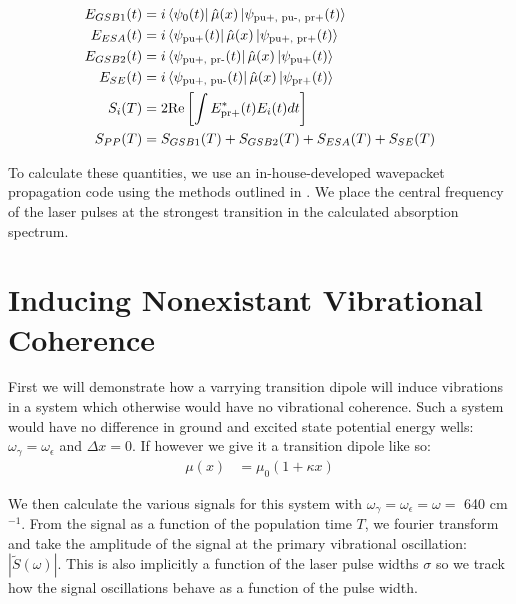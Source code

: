 \begin{align*}
	E_{GSB1} (t) &=  i \bra{\psi_{0} (t)} \hat{\mu} (x) \ket{\psi_{\text{pu+, pu-, pr+}} (t)}\\
	E_{ESA} (t) &=  i \bra{\psi_{\text{pu+}} (t)} \hat{\mu} (x) \ket{\psi_{\text{pu+, pr+}} (t)}\\
	E_{GSB2} (t) &=  i \bra{\psi_{\text{pu+, pr-}} (t)} \hat{\mu} (x) \ket{\psi_{\text{pu+}} (t)}\\
	E_{SE} (t) &=  i \bra{\psi_{\text{pu+, pu-}} (t)} \hat{\mu} (x) \ket{\psi_{\text{pr+}} (t)} \\
	S_{i} (T) &= 2 \text{Re} \left[ \int E^*_{\text{pr+}} (t) E_i (t) dt  \right] \\
	S_{PP} (T) &= S_{GSB1} (T) + S_{GSB2} (T) + S_{ESA} (T) + S_{SE} (T)
\end{align*}

To calculate these quantities, we use an in-house-developed wavepacket propagation code using the methods outlined in \cite{Mukamel1995,UFSwavepackets,Tannor2007,technique}.  We place the central frequency of the laser pulses at the strongest transition in the calculated absorption spectrum.


\section{Inducing Nonexistant Vibrational Coherence}
First we will demonstrate how a varrying transition dipole will induce vibrations in a system which otherwise would have no vibrational coherence.  Such a system would have no difference in ground and excited state potential energy wells: $\omega_{\gamma} = \omega_{\epsilon}$ and $\Delta x = 0$.  If however we give it a transition dipole like so:
\begin{align}
	\mu(x) &= \mu_0\left( 1 +  \kappa x \right)
\end{align}

We then calculate the various signals for this system with $\omega_{\gamma} = \omega_{\epsilon} = \omega = $ 640 cm$^{-1}$.  From the signal as a function of the population time $T$, we fourier transform and take the amplitude of the signal at the primary vibrational oscillation: $\left|\tilde{S}(\omega) \right|$.  This is also implicitly a function of the laser pulse widths $\sigma$ so we track how the signal oscillations behave as a function of the pulse width.

